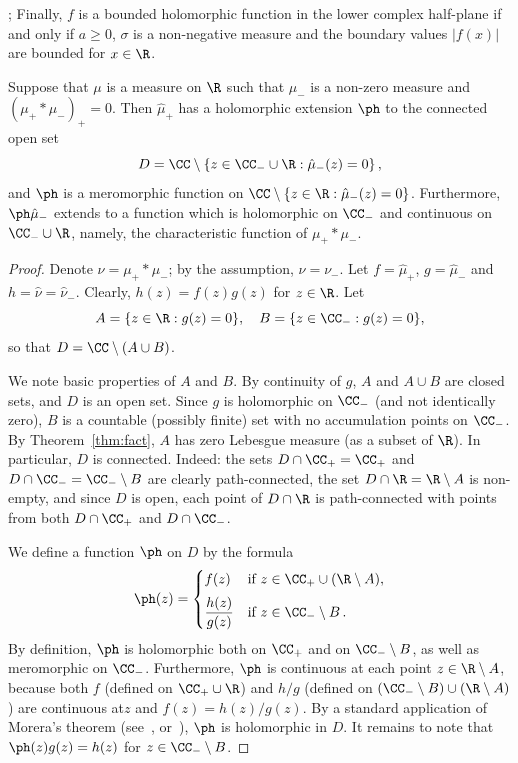 \begin{theo}{\cite[Theorem~II.5.5 and Corollary~II.5.7]{bib:g07}; \cite[Theorem~13.15]{bib:m09}}
Finally, $f$ is a bounded holomorphic function in the lower complex half-plane if and only if $a \ge 0$, $\sigma$ is a non-negative measure and the boundary values $|f(x)|$ are bounded for $x \in \R$.
\end{theo}

\begin{lemm}\label{lem:ext}
Suppose that $\mu$ is a measure on $\R$ such that $\mu_-$ is a non-zero measure and $(\mu_+ * \mu_-)_+ = 0$. Then $\hat\mu_+$ has a holomorphic extension $\ph$ to the connected open set
\[
D = \CC \setminus \left\{z \in \CC_- \cup \R : \hat\mu_-(z) = 0\right\},
\]
and $\ph$ is a meromorphic function on $\CC \setminus \{z \in \R : \hat\mu_-(z) = 0\}$. Furthermore, $\ph \hat\mu_-$ extends to a function which is holomorphic on $\CC_-$ and continuous on $\CC_- \cup \R$, namely, the characteristic function of $\mu_+ * \mu_-$.
\end{lemm}

\begin{proof}
Denote $\nu = \mu_+ * \mu_-$; by the assumption, $\nu = \nu_-$. Let $f = \hat\mu_+$, $g = \hat\mu_-$ and $h = \hat \nu = \hat \nu_-$. Clearly, $h(z) = f(z) g(z)$ for $z \in \R$. Let
\[
A = \{ z \in \R : g(z) = 0 \},\quad B = \{ z \in \CC_- : g(z) = 0 \},
\]
so that $D = \CC \setminus (A \cup B)$.

We note basic properties of $A$ and $B$. By continuity of $g$, $A$ and $A\cup B$ are closed sets, and $D$ is an open set. Since $g$ is holomorphic on $\CC_-$ (and not identically zero), $B$ is a countable (possibly finite) set with no accumulation points on $\CC_-$. By Theorem~\ref{thm:fact}, $A$ has zero Lebesgue measure (as a subset of $\R$). In particular, $D$ is connected. Indeed: the sets $D \cap \CC_+ = \CC_+$ and $D \cap \CC_- = \CC_- \setminus B$ are clearly path-connected, the set $D \cap \R = \R \setminus A$ is non-empty, and since $D$ is open, each point of $D \cap \R$ is path-connected with points from both $D \cap \CC_+$ and $D \cap \CC_-$.

We define a function $\ph$ on $D$ by the formula
\[
\ph(z) =
\begin{cases}
f(z) & \text{if }z \in \CC_+ \cup (\R \setminus A), \\[0.5em]
\dfrac{h(z)}{g(z)} & \text{if }z \in \CC_- \setminus B\,.
\end{cases}
\]
By definition, $\ph$ is holomorphic both on $\CC_+$ and on $\CC_- \setminus B$, as well as meromorphic on $\CC_-$. Furthermore, $\ph$ is continuous at each point $z \in \R \setminus A$, because both $f$ (defined on $\CC_+ \cup \R$) and $h / g$ (defined on $(\CC_- \setminus B) \cup (\R \setminus A)$) are continuous at\linebreak$z$ and $f(z) = h(z) / g(z)$. By a standard application of Morera's theorem (see~\cite[Theorem~IV.5.10 and Exercise~IV.5.9]{bib:c73}, or~\cite[Exercise~II.12]{bib:g07}), $\ph$ is holomorphic in $D$. It remains to note that $\ph(z) g(z) = h(z)$ for $z \in \CC_- \setminus B$.
\end{proof}

